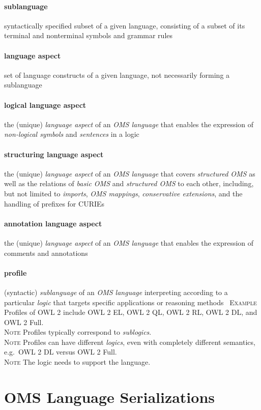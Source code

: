 \documentclass[10pt,%
\ifpretendfinal
final%
\else
draft%
\fi,
]{scrreprt}
\newcommand*{\termref}[1]{\textit{#1}}
\newcommand{\sclause}[1]{\section{#1}}
\newcommand{\termdefinition}[2]{\paragraph{#1} #2}
\newenvironment{definitions}[0]{\medskip }{}
\newenvironment{note}[0]{\ \\ \textsc{Note} \quad}{}
\newenvironment{example}[0]{\ \newline \textsc{Example}\quad }{}
\begin{document}
\begin{definitions}
  \termdefinition{sublanguage}{syntactically specified subset of a given language, consisting of a subset of its terminal and nonterminal symbols and grammar rules}

 \termdefinition{language aspect}{set of language constructs of a given language, not necessarily forming a sublanguage}

  \termdefinition{logical language aspect}{the (unique) \termref{language aspect} of an \termref{OMS language} that enables the expression of \termref{non-logical symbols} and \termref{sentences} in a logic}

\termdefinition{structuring language aspect}{the (unique) \termref{language aspect} of an \termref{OMS language} 
that covers \termref{structured OMS} as well as the relations of \termref{basic OMS} and \termref{structured OMS} 
to each other, including, but not limited to \termref{imports}, \termref{OMS mappings}, \termref{conservative extensions}, 
and the handling of prefixes for CURIEs}

  \termdefinition{annotation language aspect}{the (unique) \termref{language aspect} of an \termref{OMS language} that enables the  expression of comments and annotations}

  \termdefinition{profile}{(syntactic) \termref{sublanguage} of an \termref{OMS language} interpreting according to a particular \termref{logic}
that targets specific applications or reasoning methods}
  \begin{example}
    Profiles of OWL 2 include OWL 2 EL, OWL 2 QL, OWL 2 RL, OWL 2 DL, and OWL 2 Full.
  \end{example}
  \begin{note}
  Profiles typically correspond to \termref{sublogics}.
  \end{note}
  \begin{note}
  Profiles can have different \termref{logics}, even with completely
  different semantics, e.g.\ OWL 2 DL versus OWL 2 Full.
  \end{note}
  \begin{note}
    The logic needs to support the language.
  \end{note}
  
\end{definitions}

\sclause{OMS Language Serializations}
\end{document}
